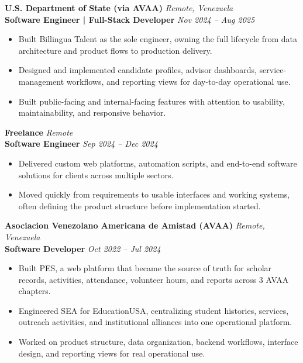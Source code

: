 \documentclass[11pt]{article}
\begin{document}
\vspace{10pt}
\textbf{U.S. Department of State (via AVAA)} \hfill \textit{Remote, Venezuela} \\
\textbf{Software Engineer | Full-Stack Developer} \hfill \textit{Nov 2024 -- Aug 2025}
\begin{itemize}
    \item Built Billingua Talent as the sole engineer, owning the full lifecycle from data architecture and product flows to production delivery.
    \item Designed and implemented candidate profiles, advisor dashboards, service-management workflows, and reporting views for day-to-day operational use.
    \item Built public-facing and internal-facing features with attention to usability, maintainability, and responsive behavior.
\end{itemize}
\vspace{10pt}
\textbf{Freelance} \hfill \textit{Remote} \\
\textbf{Software Engineer} \hfill \textit{Sep 2024 -- Dec 2024}
\begin{itemize}
    \item Delivered custom web platforms, automation scripts, and end-to-end software solutions for clients across multiple sectors.
    \item Moved quickly from requirements to usable interfaces and working systems, often defining the product structure before implementation started.
\end{itemize}
\vspace{10pt}
\textbf{Asociacion Venezolano Americana de Amistad (AVAA)} \hfill \textit{Remote, Venezuela} \\
\textbf{Software Developer} \hfill \textit{Oct 2022 -- Jul 2024}
\begin{itemize}
    \item Built PES, a web platform that became the source of truth for scholar records, activities, attendance, volunteer hours, and reports across 3 AVAA chapters.
    \item Engineered SEA for EducationUSA, centralizing student histories, services, outreach activities, and institutional alliances into one operational platform.
    \item Worked on product structure, data organization, backend workflows, interface design, and reporting views for real operational use.
\end{itemize}
\vspace{10pt}
\end{document}
